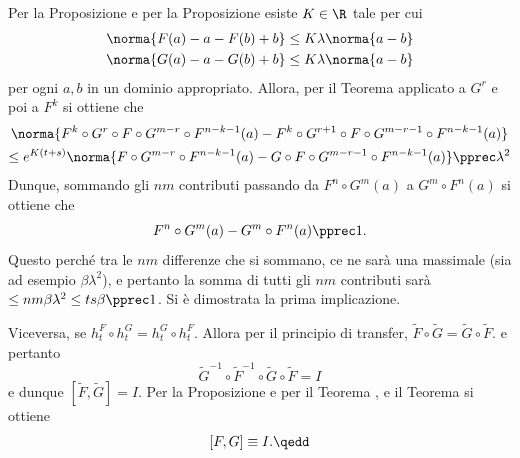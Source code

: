 {    Per la Proposizione  e per la Proposizione  esiste $ K \in \R $ tale per cui \begin{align*}
        \norma{F(a)-a-F(b)+b} &\le K \lambda\norma{a-b}\\ 
        \norma{G(a)-a-G(b)+b} &\le K \lambda\norma{a-b}
    \end{align*}per ogni $ a,b $ in un dominio appropriato. 
    Allora, per il Teorema  applicato a $ G^{r} $ e poi a $ F^{k} $ si ottiene che \begin{multline*}
        \norma{F^{k}\circ G^{r} \circ F\circ G^{m-r} \circ F^{n-k-1}(a)- F^{k}\circ G^{r+1} \circ F\circ G^{m-r-1}\circ F^{n-k-1}(a)}\\ 
        \le e^{K(t+s)}\norma{F\circ G^{m-r} \circ F^{n-k-1}(a)-G\circ F\circ G^{m-r-1}\circ F^{n-k-1}(a)}\pprec \lambda^{2}
    \end{multline*}Dunque, sommando gli $ nm$ contributi passando da $ F^{n}\circ G^{m}(a) $ a $ G^{m}\circ F^{n}(a)$ si ottiene che \begin{equation*}
        F^{n}\circ G^{m}(a)-G^{m}\circ F^{n}(a)\pprec 1.
    \end{equation*}Questo perché tra le $ nm $ differenze che si sommano, ce ne sarà una massimale (sia ad esempio $ \beta \lambda^{2} $), e pertanto la somma di tutti gli $ nm $ contributi sarà $ \le nm\beta \lambda^{2}\le ts\beta \pprec 1 $. Si è dimostrata la prima implicazione.

    Viceversa, se $ h_{t}^{F}\circ h_{t}^{G} = h_{t}^{G}\circ h_{t}^{F}  $. Allora per il principio di transfer, $ \tilde{F}\circ \tilde{G} = \tilde{G} \circ \tilde{F} $. e pertanto \begin{equation*}
        \tilde{G}^{-1}\circ \tilde{F}^{-1} \circ \tilde{G}\circ\tilde{F} = I
    \end{equation*}e dunque $ [\tilde{F},\tilde{G}]=I $. Per la Proposizione  e per il Teorema , e il Teorema   si ottiene \[[F,G]\equiv I .\qedd\]
}

